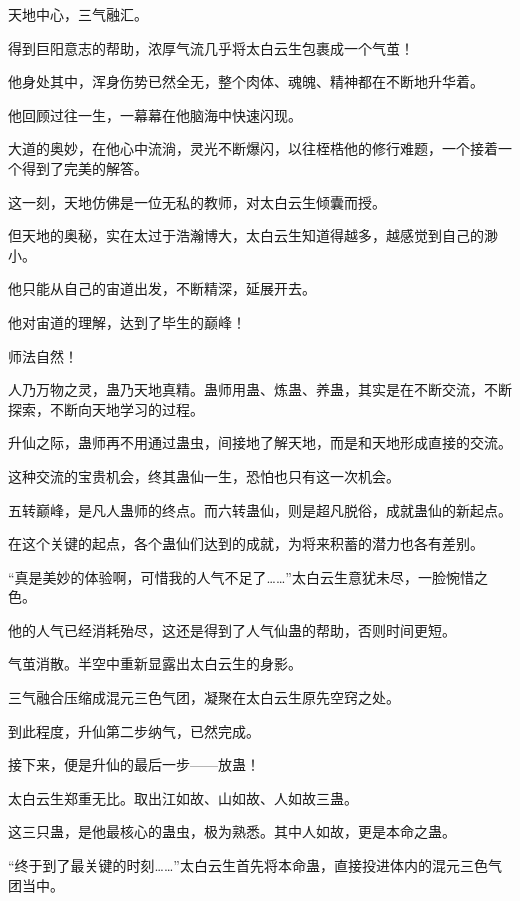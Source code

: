 
\begin{this_body}

天地中心，三气融汇。

得到巨阳意志的帮助，浓厚气流几乎将太白云生包裹成一个气茧！

他身处其中，浑身伤势已然全无，整个肉体、魂魄、精神都在不断地升华着。

他回顾过往一生，一幕幕在他脑海中快速闪现。

大道的奥妙，在他心中流淌，灵光不断爆闪，以往桎梏他的修行难题，一个接着一个得到了完美的解答。

这一刻，天地仿佛是一位无私的教师，对太白云生倾囊而授。

但天地的奥秘，实在太过于浩瀚博大，太白云生知道得越多，越感觉到自己的渺小。

他只能从自己的宙道出发，不断精深，延展开去。

他对宙道的理解，达到了毕生的巅峰！

师法自然！

人乃万物之灵，蛊乃天地真精。蛊师用蛊、炼蛊、养蛊，其实是在不断交流，不断探索，不断向天地学习的过程。

升仙之际，蛊师再不用通过蛊虫，间接地了解天地，而是和天地形成直接的交流。

这种交流的宝贵机会，终其蛊仙一生，恐怕也只有这一次机会。

五转巅峰，是凡人蛊师的终点。而六转蛊仙，则是超凡脱俗，成就蛊仙的新起点。

在这个关键的起点，各个蛊仙们达到的成就，为将来积蓄的潜力也各有差别。

“真是美妙的体验啊，可惜我的人气不足了……”太白云生意犹未尽，一脸惋惜之色。

他的人气已经消耗殆尽，这还是得到了人气仙蛊的帮助，否则时间更短。

气茧消散。半空中重新显露出太白云生的身影。

三气融合压缩成混元三色气团，凝聚在太白云生原先空窍之处。

到此程度，升仙第二步纳气，已然完成。

接下来，便是升仙的最后一步——放蛊！

太白云生郑重无比。取出江如故、山如故、人如故三蛊。

这三只蛊，是他最核心的蛊虫，极为熟悉。其中人如故，更是本命之蛊。

“终于到了最关键的时刻……”太白云生首先将本命蛊，直接投进体内的混元三色气团当中。


\end{this_body}
